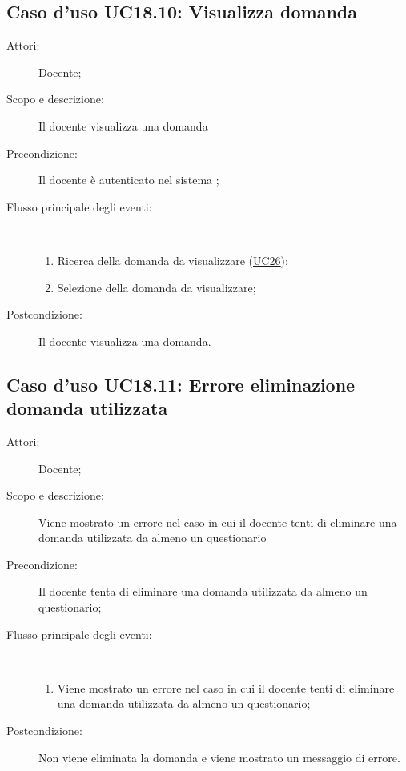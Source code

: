 \subsection{Caso d'uso UC18.10: Visualizza domanda}\begin{description}
\item[Attori:] Docente;
\item[Scopo e descrizione:] Il docente visualizza una domanda
      \item[Precondizione:] Il docente è autenticato nel sistema
;

        \item[Flusso principale degli eventi:] \ 
 \begin{enumerate}
          \item Ricerca della domanda da visualizzare (\hyperlink{UC26}{UC26});
          \item Selezione della domanda da visualizzare;

      \end{enumerate}
    \item[Postcondizione:] Il docente visualizza una domanda.
  \end{description}
\hypertarget{UC18.11}{}
\subsection{Caso d'uso UC18.11: Errore eliminazione domanda utilizzata}\begin{description}
\item[Attori:] Docente;
\item[Scopo e descrizione:] Viene mostrato un errore nel caso in cui il docente tenti di eliminare una domanda utilizzata da almeno un questionario
      \item[Precondizione:] Il docente tenta di eliminare una domanda utilizzata da almeno un questionario;

        \item[Flusso principale degli eventi:] \ 
 \begin{enumerate}
          \item Viene mostrato un errore nel caso in cui il docente tenti di eliminare una domanda utilizzata da almeno un questionario;

      \end{enumerate}
    \item[Postcondizione:] Non viene eliminata la domanda e viene mostrato un messaggio di errore.
  \end{description}
\hypertarget{UC19}{}
